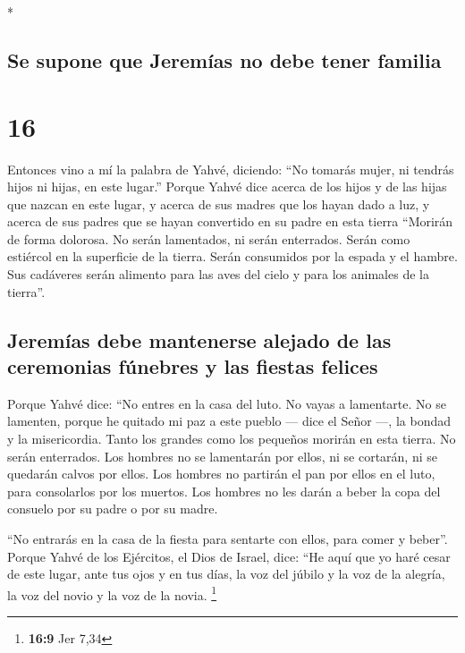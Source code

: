 \begin{paracol}{2}
\begin{otherlanguage}{english}
\end{otherlanguage}

\switchcolumn[0]*

\hypertarget{se-supone-que-jeremuxedas-no-debe-tener-familia}{%
\subsection{Se supone que Jeremías no debe tener
familia}\label{se-supone-que-jeremuxedas-no-debe-tener-familia}}

\hypertarget{section-30}{%
\section{16}\label{section-30}}

 Entonces vino a mí la palabra de Yahvé, diciendo:
 ``No tomarás mujer, ni tendrás hijos ni hijas, en este
lugar.''  Porque Yahvé dice acerca de los hijos y de las
hijas que nazcan en este lugar, y acerca de sus madres que los hayan
dado a luz, y acerca de sus padres que se hayan convertido en su padre
en esta tierra  ``Morirán de forma dolorosa. No serán
lamentados, ni serán enterrados. Serán como estiércol en la superficie
de la tierra. Serán consumidos por la espada y el hambre. Sus cadáveres
serán alimento para las aves del cielo y para los animales de la
tierra''.

\hypertarget{jeremuxedas-debe-mantenerse-alejado-de-las-ceremonias-fuxfanebres-y-las-fiestas-felices}{%
\subsection{Jeremías debe mantenerse alejado de las ceremonias fúnebres
y las fiestas
felices}\label{jeremuxedas-debe-mantenerse-alejado-de-las-ceremonias-fuxfanebres-y-las-fiestas-felices}}

 Porque Yahvé dice: ``No entres en la casa del luto. No
vayas a lamentarte. No se lamenten, porque he quitado mi paz a este
pueblo --- dice el Señor ---, la bondad y la misericordia.
 Tanto los grandes como los pequeños morirán en esta
tierra. No serán enterrados. Los hombres no se lamentarán por ellos, ni
se cortarán, ni se quedarán calvos por ellos.  Los hombres
no partirán el pan por ellos en el luto, para consolarlos por los
muertos. Los hombres no les darán a beber la copa del consuelo por su
padre o por su madre.

 ``No entrarás en la casa de la fiesta para sentarte con
ellos, para comer y beber''.  Porque Yahvé de los
Ejércitos, el Dios de Israel, dice: ``He aquí que yo haré cesar de este
lugar, ante tus ojos y en tus días, la voz del júbilo y la voz de la
alegría, la voz del novio y la voz de la novia. \footnote{\textbf{16:9}
  Jer 7,34}


\end{paracol}
